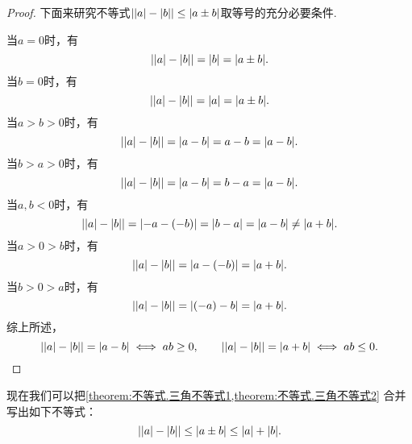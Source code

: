 \begin{theorem}[三角不等式II]
\begin{proof}
下面来研究不等式\(\abs{\abs{a}-\abs{b}} \leq \abs{a \pm b}\)取等号的充分必要条件.

当\(a=0\)时，有\begin{equation*}
	\abs{\abs{a}-\abs{b}}
	= \abs{b}
	= \abs{a \pm b}.
\end{equation*}
当\(b=0\)时，有\begin{equation*}
	\abs{\abs{a}-\abs{b}}
	= \abs{a}
	= \abs{a \pm b}.
\end{equation*}
当\(a>b>0\)时，有\begin{equation*}
	\abs{\abs{a}-\abs{b}}
	= \abs{a-b}
	= a-b
	= \abs{a-b}.
\end{equation*}
当\(b>a>0\)时，有\begin{equation*}
	\abs{\abs{a}-\abs{b}}
	= \abs{a-b}
	= b-a
	= \abs{a-b}.
\end{equation*}
当\(a,b<0\)时，有\begin{equation*}
	\abs{\abs{a}-\abs{b}}
	= \abs{-a-(-b)}
	= \abs{b-a}
	= \abs{a-b}
	\neq \abs{a+b}.
\end{equation*}
当\(a>0>b\)时，有\begin{equation*}
	\abs{\abs{a}-\abs{b}}
	= \abs{a-(-b)}
	= \abs{a+b}.
\end{equation*}
当\(b>0>a\)时，有\begin{equation*}
	\abs{\abs{a}-\abs{b}}
	= \abs{(-a)-b}
	= \abs{a+b}.
\end{equation*}
综上所述，\begin{equation*}
	\abs{\abs{a}-\abs{b}}=\abs{a-b} \iff ab \geq 0, \qquad
	\abs{\abs{a}-\abs{b}}=\abs{a+b} \iff ab \leq 0.
	\qedhere
\end{equation*}
\end{proof}
\end{theorem}

现在我们可以把\cref{theorem:不等式.三角不等式1,theorem:不等式.三角不等式2} 合并写出如下不等式：
\begin{equation}
	\abs{\abs{a}-\abs{b}}\leq\abs{a \pm b}\leq\abs{a}+\abs{b}.
\end{equation}

